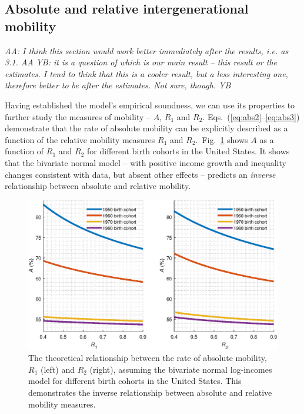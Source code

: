 \documentclass[12pt,a4paper]{article}
\newcommand{\red}[1]{{\color{red} #1}}
\newcommand{\blue}[1]{{\color{blue} #1}}
\newcommand{\AAA}[1]{\red{{\it AA: #1 AA}}}
\newcommand{\YB}[1]{\blue{{\it YB: #1 YB}}}
\newcommand{\flabel}[1]{\label{fig:#1}}
\newcommand{\fref}[1]{Fig.~\ref{fig:#1}}
\numberwithin{equation}{section}
\begin{document}
\subsection{Absolute and relative intergenerational mobility}
\label{sec:theory}

\AAA{I think this section would work better immediately after the results, i.e. as 3.1.} \YB{ it is a question of which is our main result -- this result or the estimates. I tend to think that this is a cooler result, but a less interesting one, therefore better to be after the estimates. Not sure, though.}

Having established the model's empirical soundness, we can use its properties to further study the measures of mobility -- $A$, $R_1$ and $R_2$. Eqs.~(\ref{eq:abs2}--\ref{eq:abs3}) demonstrate that the rate of absolute mobility can be explicitly described as a function of the relative mobility measures $R_1$ and $R_2$.~\fref{relat} shows $A$ as a function of $R_1$ and $R_2$ for different birth cohorts in the United States. It shows that the bivariate normal model -- with positive income growth and inequality changes consistent with data, but absent other effects -- predicts an \textit{inverse} relationship between absolute and relative mobility.

\begin{figure}[!htb]
\centering
\includegraphics[width=1.0\textwidth] {./figs/R1_R2_2.eps}
\caption{The theoretical relationship between the rate of absolute mobility, $R_1$ (left) and $R_2$ (right), assuming the bivariate normal log-incomes model for different birth cohorts in the United States. This demonstrates the inverse relationship between absolute and relative mobility measures.}
\flabel{relat}
\end{figure}
\end{document}

